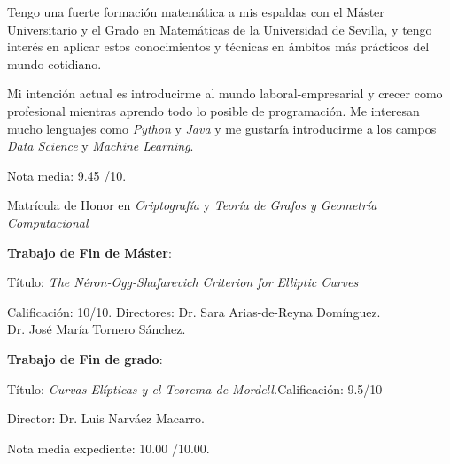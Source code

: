 \documentclass[10pt,a4paper]{altacv}
\begin{document}
Tengo una fuerte formación matemática a mis espaldas con el Máster Universitario y el Grado en Matemáticas de la Universidad de Sevilla, y tengo interés en aplicar estos conocimientos y técnicas en ámbitos más prácticos del mundo cotidiano. 

Mi intención actual es introducirme al mundo laboral-empresarial y crecer como profesional mientras aprendo todo lo posible de programación. Me interesan mucho lenguajes como \emph{Python} y \emph{Java} y me gustaría introducirme a los campos \emph{Data Science} y \emph{Machine Learning}.
 

Nota media: 9.45 /10.

Matrícula de Honor en \textit{Criptografía} y \textit{Teoría de Grafos y Geometría Computacional}

\textbf{Trabajo de Fin de Máster}:

Título: \textit{The Néron-Ogg-Shafarevich Criterion for Elliptic Curves}

Calificación: 10/10.\quad
Directores: Dr. Sara Arias-de-Reyna Domínguez. \\
		\hspace{51mm}	Dr. José María Tornero Sánchez.
			

\textbf{Trabajo de Fin de grado}:

Título: \textit{Curvas Elípticas y el Teorema de Mordell.}\quad Calificación: 9.5/10 

Director: Dr. Luis Narváez Macarro.

Nota media expediente: 10.00 /10.00.

%



\end{document}
